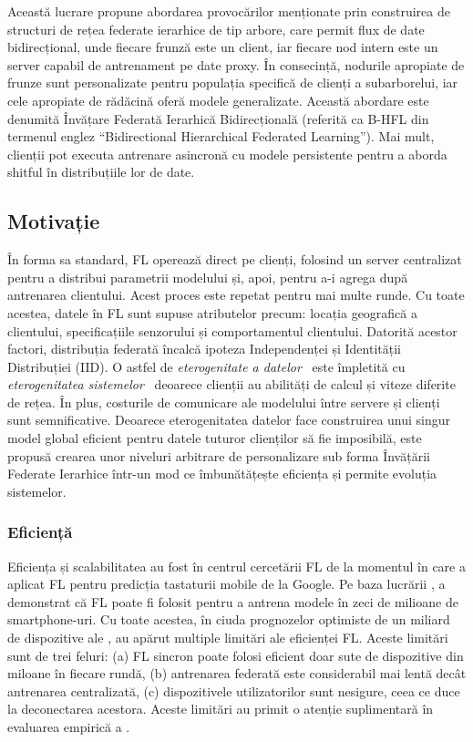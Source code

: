Această lucrare propune abordarea provocărilor menționate prin construirea de structuri de rețea federate ierarhice de tip arbore, care permit flux de date bidirecțional, unde fiecare frunză este un client, iar fiecare nod intern este un server capabil de antrenament pe date proxy. În consecință, nodurile apropiate de frunze sunt personalizate pentru populația specifică de clienți a subarborelui, iar cele apropiate de rădăcină oferă modele generalizate. Această abordare este denumită Învățare Federată Ierarhică Bidirecțională (referită ca B-HFL din termenul englez ``Bidirectional Hierarchical Federated Learning''). Mai mult, clienții pot executa antrenare asincronă cu modele persistente pentru a aborda shitful în distribuțiile lor de date.
\subsection{Motivație}

În forma sa standard, FL operează direct pe clienți, folosind un server centralizat pentru a distribui parametrii modelului și, apoi, pentru a-i agrega după antrenarea clientului. Acest proces este repetat pentru mai multe runde. Cu toate acestea, datele în FL sunt supuse atributelor precum: locația geografică a clientului, specificațiile senzorului și comportamentul clientului. Datorită acestor factori, distribuția federată încalcă ipoteza Independenței și Identității Distribuției (IID). O astfel de \emph{eterogenitate a datelor}~\citep[sec. 3.1]{AdvancedAndOpenProblems} este împletită cu \emph{eterogenitatea sistemelor}~\citep[sec. 7.2]{AdvancedAndOpenProblems} deoarece clienții au abilități de calcul și viteze diferite de rețea. În plus, costurile de comunicare ale modelului între servere și clienți sunt semnificative. Deoarece eterogenitatea datelor face construirea unui singur model global eficient pentru datele tuturor clienților să fie imposibilă, este propusă crearea unor niveluri arbitrare de personalizare sub forma Învățării Federate Ierarhice într-un mod ce îmbunătățește eficiența și permite evoluția sistemelor.
\subsubsection{Eficiență}

Eficiența și scalabilitatea au fost în centrul cercetării FL de la momentul în care \citet{GoogleKeyboard} a aplicat FL pentru predicția tastaturii mobile de la Google. Pe baza lucrării \citet{GoogleKeyboard}, \citet{ScaleSystemDesign} a demonstrat că FL poate fi folosit pentru a antrena modele în zeci de milioane de smartphone-uri. Cu toate acestea, în ciuda prognozelor optimiste de un miliard de dispozitive ale \citet{ScaleSystemDesign}, au apărut multiple limitări ale eficienței FL. Aceste limitări sunt de trei feluri: (a) FL sincron poate folosi eficient doar sute de dispozitive din miloane în fiecare rundă, (b) antrenarea federată este considerabil mai lentă decât antrenarea centralizată, (c) dispozitivele utilizatorilor sunt nesigure, ceea ce duce la deconectarea acestora. Aceste limitări au primit o atenție suplimentară în evaluarea empirică a \citet{LargeCohorts}.

